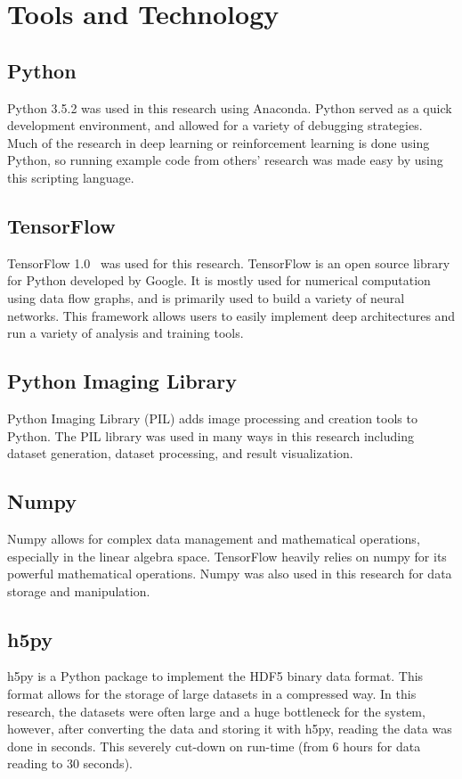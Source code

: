 \documentclass[12pt,american]{report}
\begin{document}
\section{Tools and Technology}
\subsection{Python}
Python 3.5.2 was used in this research using Anaconda.  Python served as a quick development environment, and allowed for a variety of debugging strategies.  Much of the research in deep learning or reinforcement learning is done using Python, so running example code from others' research was made easy by using this scripting language.
\subsection{TensorFlow}
TensorFlow 1.0~\cite{tensorflow2015-whitepaper} was used for this research.  TensorFlow is an open source library for Python developed by Google.  It is mostly used for numerical computation using data flow graphs, and is primarily used to build a variety of neural networks.  This framework allows users to easily implement deep architectures and run a variety of analysis and training tools.  
\subsection{Python Imaging Library}
Python Imaging Library (PIL) adds image processing and creation tools to Python. The PIL library was used in many ways in this research including dataset generation, dataset processing, and result visualization.
\subsection{Numpy}
Numpy allows for complex data management and mathematical operations, especially in the linear algebra space.  TensorFlow heavily relies on numpy for its powerful mathematical operations.  Numpy was also used in this research for data storage and manipulation. 
\subsection{h5py}
h5py is a Python package to implement the HDF5 binary data format.  This format allows for the storage of large datasets in a compressed way.  In this research, the datasets were often large and a huge bottleneck for the system, however, after converting the data and storing it with h5py, reading the data was done in seconds.  This severely cut-down on run-time (from 6 hours for data reading to 30 seconds). 
\end{document}
